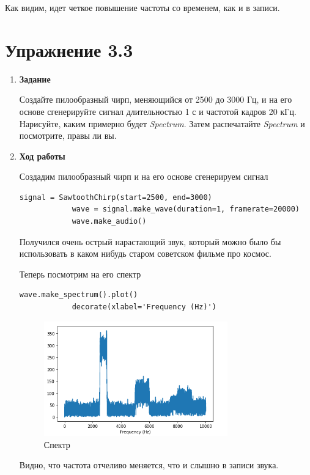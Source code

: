 \documentclass[a4paper,12pt]{article}
\begin{document}
\begin{enumerate}
		Как видим, идет четкое повышение частоты со временем, как и в записи.
	\end{enumerate}
	
	\newpage
	
	\section{Упражнение 3.3}
	
	\begin{enumerate}
		
		\item \textbf{Задание}
		
		Создайте пилообразный чирп, меняющийся от 2500 до 3000 Гц, и на его основе сгенерируйте сигнал длительностью 1 с и частотой кадров 20 кГц. Нарисуйте, каким примерно будет \textit{Spectrum}. Затем распечатайте \textit{Spectrum} и посмотрите, правы ли вы.
		
		\item \textbf{Ход работы}
		
		Создадим пилообразный чирп и на его основе сгенерируем сигнал
		\begin{lstlisting}[caption=Чирп и сигнал]
			signal = SawtoothChirp(start=2500, end=3000)
			wave = signal.make_wave(duration=1, framerate=20000)
			wave.make_audio()
		\end{lstlisting}
		
		Получился очень острый нарастающий звук, который можно было бы использовать в каком нибудь старом советском фильме про космос.
		
		Теперь посмотрим на его спектр
		\begin{lstlisting}[caption=Создание спектра]
			wave.make_spectrum().plot()
			decorate(xlabel='Frequency (Hz)')
		\end{lstlisting}
		\begin{figure}[H]
			\centering
			\includegraphics[width=0.75\textwidth]{3_1.png}
			\caption{Спектр}
			\label{fig:3.1}
		\end{figure}
		
		Видно, что частота отчеливо меняется, что и слышно в записи звука.
		
	\end{enumerate}
	
\end{document}
